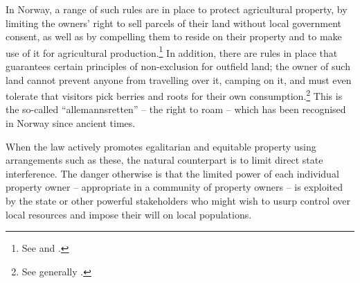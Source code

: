In Norway, a range of such rules are in place to protect agricultural property, by limiting the owners' right to sell parcels of their land without local government consent, as well as by compelling them to reside on their property and to make use of it for agricultural production.\footnote{See \dni\cite[8|12]{la95} and \dni\cite[4|5]{lca03}.} In addition, there are rules in place that guarantees certain principles of non-exclusion for outfield land; the owner of such land cannot prevent anyone from travelling over it, camping on it, and must even tolerate that visitors pick berries and roots for their own consumption.\footnote{See generally \cite{backer07}.} This is the so-called ``allemannsretten'' -- the right to roam -- which has been recognised in Norway since ancient times.

When the law actively promotes egalitarian and equitable property using arrangements such as these, the natural counterpart is to limit direct state interference. The danger otherwise is that the limited power of each individual property owner -- appropriate in a community of property owners -- is exploited by the state or other powerful stakeholders who might wish to usurp control over local resources and impose their will on local populations.

